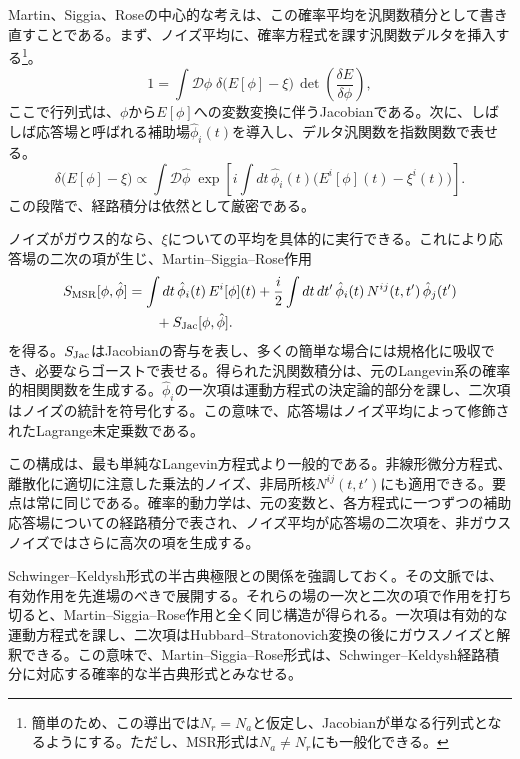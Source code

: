 \documentclass[a4paper,11pt,oneside]{article}
\theoremstyle{definition}
\numberwithin{equation}{section}
\begin{document}
Martin、Siggia、Roseの中心的な考えは、この確率平均を汎関数積分として書き直すことである。まず、ノイズ平均に、確率方程式を課す汎関数デルタを挿入する\footnote{簡単のため、この導出では$  N_{r}=N_{a} $と仮定し、Jacobianが単なる行列式となるようにする。ただし、MSR形式は$  N_{a}\neq N_{r} $にも一般化できる。}。
\begin{equation}
1=
\int \mathcal D\phi\;
\delta\!\bigl(E[\phi]-\xi\bigr)\,
\det\!\left(\frac{\delta E}{\delta \phi}\right) ,
\end{equation}
ここで行列式は、\(\phi\)から\(E[\phi]\)への変数変換に伴うJacobianである。次に、しばしば応答場と呼ばれる補助場\(\hat\phi_i(t)\)を導入し、デルタ汎関数を指数関数で表せる。
\begin{equation}
\delta\!\bigl(E[\phi]-\xi\bigr)
\propto
\int \mathcal D\hat\phi\;
\exp\!\left[
i\int dt\,\hat\phi_i(t)\bigl(E^i[\phi](t)-\xi^i(t)\bigr)
\right] .
\end{equation}
この段階で、経路積分は依然として厳密である。



ノイズがガウス的なら、\(\xi\)についての平均を具体的に実行できる。これにより応答場の二次の項が生じ、Martin--Siggia--Rose作用
\begin{align}
S_{\rm MSR}[\phi,\hat\phi]
&=
\int dt\,\hat\phi_i(t)\,E^i[\phi](t)
+\frac{i}{2}\int dt\,dt'\,
\hat\phi_i(t)\,N^{ij}(t,t')\,\hat\phi_j(t')
\nonumber\\
&\qquad
+S_{\rm Jac}[\phi,\hat\phi] .
\end{align}
を得る。\(S_{\rm Jac}\)はJacobianの寄与を表し、多くの簡単な場合には規格化に吸収でき、必要ならゴーストで表せる。得られた汎関数積分は、元のLangevin系の確率的相関関数を生成する。\(\hat\phi_i\)の一次項は運動方程式の決定論的部分を課し、二次項はノイズの統計を符号化する。この意味で、応答場はノイズ平均によって修飾されたLagrange未定乗数である。



この構成は、最も単純なLangevin方程式より一般的である。非線形微分方程式、離散化に適切に注意した乗法的ノイズ、非局所核\(N^{ij}(t,t')\)にも適用できる。要点は常に同じである。確率的動力学は、元の変数と、各方程式に一つずつの補助応答場についての経路積分で表され、ノイズ平均が応答場の二次項を、非ガウスノイズではさらに高次の項を生成する。



Schwinger--Keldysh形式の半古典極限との関係を強調しておく。その文脈では、有効作用を先進場のべきで展開する。それらの場の一次と二次の項で作用を打ち切ると、Martin--Siggia--Rose作用と全く同じ構造が得られる。一次項は有効的な運動方程式を課し、二次項はHubbard--Stratonovich変換の後にガウスノイズと解釈できる。この意味で、Martin--Siggia--Rose形式は、Schwinger--Keldysh経路積分に対応する確率的な半古典形式とみなせる。
\end{document}
